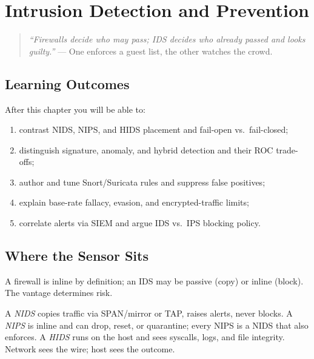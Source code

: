 \chapter{Intrusion Detection and Prevention}\label{ch:ids}
\sloppy

\begin{quote}
\emph{``Firewalls decide who may pass; IDS decides who already passed and
looks guilty.''} --- One enforces a guest list, the other watches the crowd.
\end{quote}

\noindent{}
\vspace{0.4em}

\section*{Learning Outcomes}
After this chapter you will be able to:
\begin{enumerate}[label=(L\arabic*)]
    \item contrast NIDS, NIPS, and HIDS placement and fail-open vs.\ fail-closed;
    \item distinguish signature, anomaly, and hybrid detection and their ROC trade-offs;
    \item author and tune Snort/Suricata rules and suppress false positives;
    \item explain base-rate fallacy, evasion, and encrypted-traffic limits;
    \item correlate alerts via SIEM and argue IDS vs.\ IPS blocking policy.
\end{enumerate}

\section{Where the Sensor Sits}\label{sec:placement}
A firewall is inline by definition; an IDS may be passive (copy) or inline
(block). The vantage determines risk.

\begin{definition}\label{def:nids}
A \emph{NIDS} copies traffic via SPAN/mirror or TAP, raises alerts, never
blocks. A \emph{NIPS} is inline and can drop, reset, or quarantine; every
NIPS is a NIDS that also enforces. A \emph{HIDS} runs on the host and sees
syscalls, logs, and file integrity. Network sees the wire; host sees the
outcome.
\end{definition}

